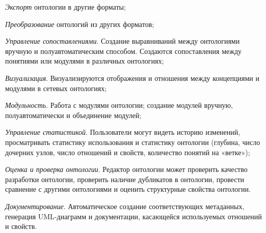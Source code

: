 \begin{SCn}
{\begin{scnitemize}
	\item \textit{Экспорт} онтологии в другие форматы;
	\item \textit{Преобразование} онтологий из других форматов;
	\item \textit{Управление сопоставлениями}. Создание выравниваний между онтологиями вручную и полуавтоматическим способом. Создаются сопоставления между понятиями или модулями в различных онтологиях;
	\item \textit{Визуализация}. Визуализируются отображения и отношения между концепциями и модулями в сетевых онтологиях;
	\item \textit{Модульность}. Работа с модулями онтологии; создание модулей вручную, полуавтоматически и объединение модулей;
	\item \textit{Управление статистикой}.  Пользователи могут видеть историю изменений, просматривать статистику использования и статистику онтологии (глубина, число дочерних узлов, число отношений и свойств, количество понятий на «ветке»);
	\item \textit{Оценка и проверка онтологии}. Редактор онтологии может проверить качество разработки онтологии, проверить наличие дубликатов в онтологии, провести сравнение с другими онтологиями и оценить структурные свойства онтологии.
	\item \textit{Документирование}. Автоматическое создание соответствующих метаданных, генерация UML-диаграмм и документации, касающейся используемых отношений и свойств.
	\end{scnitemize}}
\end{SCn}
